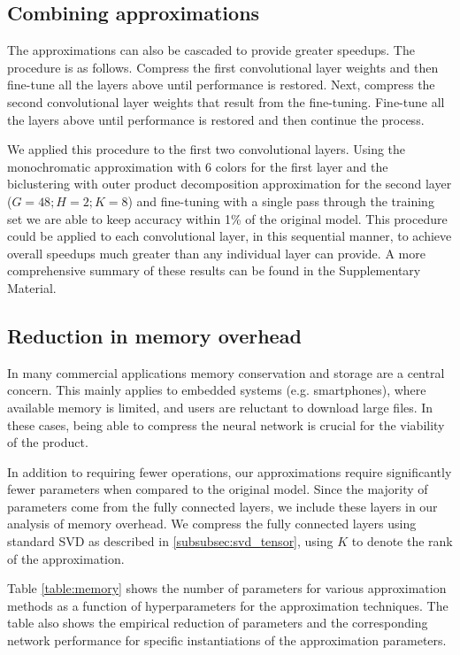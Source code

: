 \subsection{Combining approximations}
The approximations can also be cascaded to provide greater speedups.
The procedure is as follows. 
Compress the first convolutional layer weights and then 
fine-tune all the layers above until performance is restored. 
Next, compress the second convolutional layer weights that result from the fine-tuning.
Fine-tune all the layers above until performance is restored and then continue the process. 

We applied this procedure to the first two convolutional layers. 
Using the monochromatic approximation with 6 colors for the first layer and the biclustering with outer product decomposition approximation for the second layer ($G = 48; H = 2; K = 8$) and 
fine-tuning with a single pass through the training set we are able to keep accuracy within 1\% of the original model.
This procedure could be applied to each convolutional layer, in this sequential manner, to achieve overall speedups much greater than any individual layer can provide. 
A more comprehensive summary of these results can be found in the Supplementary Material.

\subsection{Reduction in memory overhead}
In many commercial applications memory conservation and storage are a
central concern. This mainly applies to embedded systems
(e.g. smartphones), where available memory is limited, and users are
reluctant to download large files. In these cases, being able to
compress the neural network is crucial for the viability of the
product. 

In addition to requiring fewer operations, our approximations
require significantly fewer parameters when compared to the original
model. 
Since the majority of parameters come from the fully connected layers, we include these layers in our analysis of memory overhead. 
We compress the fully connected layers using standard SVD as described in \ref{subsubsec:svd_tensor}, using $K$ to denote the rank of the approximation.
 
Table \ref{table:memory} shows the number of parameters for
various approximation methods as a function of hyperparameters for the approximation techniques.
The table also shows the empirical reduction of parameters and the corresponding network performance for specific instantiations of the approximation parameters.

